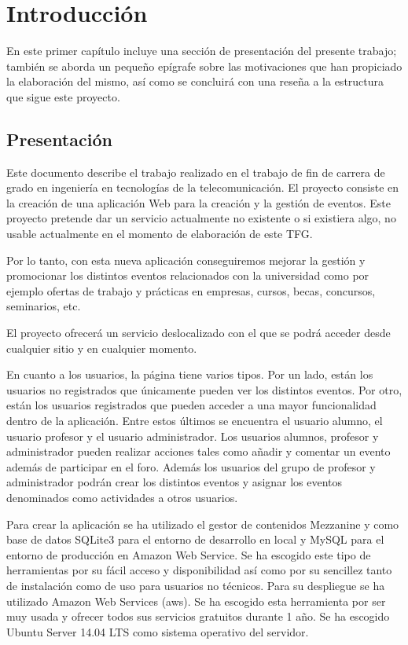 \chapter{Introducción}
\label{sec:intro}

En este primer capítulo incluye una sección de presentación del presente trabajo; también se aborda un pequeño epígrafe sobre las motivaciones que han propiciado la elaboración del mismo, así como se concluirá con una reseña a la estructura que sigue este proyecto.


\section{Presentación}

Este documento describe el trabajo realizado en el trabajo de fin de carrera de grado en ingeniería en tecnologías de la telecomunicación. El proyecto consiste en la creación de una aplicación Web para la creación y la gestión de eventos. Este proyecto pretende dar un servicio actualmente no existente o si existiera algo, no usable actualmente en el momento de elaboración de este TFG.


Por lo tanto, con esta nueva aplicación conseguiremos mejorar la gestión y promocionar los distintos eventos relacionados con la universidad como por ejemplo ofertas de trabajo y prácticas en empresas, cursos, becas, concursos, seminarios, etc.


El proyecto ofrecerá un servicio deslocalizado con el que se podrá acceder desde cualquier sitio y en cualquier  momento. 


En cuanto a los usuarios, la página tiene varios tipos. Por un lado, están los usuarios no registrados que únicamente pueden ver los distintos eventos. Por otro, están los usuarios registrados que pueden acceder a una mayor funcionalidad dentro de la aplicación. Entre estos últimos se encuentra el usuario alumno, el usuario profesor y el usuario administrador. Los usuarios alumnos, profesor y administrador pueden realizar acciones tales como añadir y comentar un evento además de participar en el foro. Además los usuarios del grupo de profesor y administrador podrán crear los distintos eventos y asignar los eventos denominados como actividades a otros usuarios.


Para crear la aplicación se ha utilizado el gestor de contenidos Mezzanine y como base de datos SQLite3 para el entorno de desarrollo en local y MySQL para el entorno de producción en Amazon Web Service. Se ha escogido este tipo de herramientas por su fácil acceso y disponibilidad así como por su sencillez tanto de instalación como de uso para usuarios no técnicos.
Para su despliegue se ha utilizado Amazon Web Services (aws). Se ha escogido esta herramienta por ser muy usada y ofrecer todos sus servicios gratuitos durante 1 año. Se ha escogido Ubuntu Server 14.04 LTS como sistema operativo del servidor.


